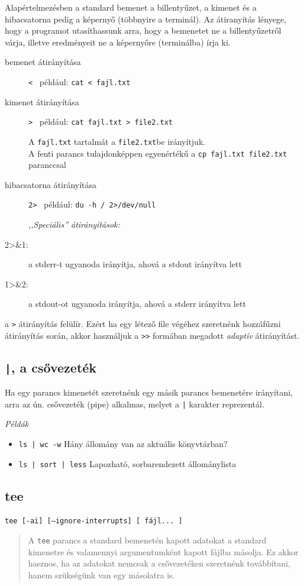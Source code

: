  Alapértelmezésben a standard bemenet a billentyűzet, a kimenet és a hibacsatorna pedig a képernyő (többnyire a terminál). Az átiranyítás lényege, hogy a programot utasíthassunk arra, hogy a bemenetet ne a billentyűzetről várja, illetve eredményeit ne a képernyőre (terminálba) írja ki. 
 
 \begin{description}
 \item[bemenet átirányítása] \verb.<. \ például: \texttt{cat < fajl.txt}
 \item[kimenet átirányítása] \verb.>. \ például: \texttt{cat fajl.txt > file2.txt} 
 
 	A \texttt{fajl.txt} tartalmát a \texttt{file2.txt}be irányítjuk.\\
 	A fenti parancs tulajdonképpen egyenértékű a \texttt{cp fajl.txt file2.txt} paranccsal
 \item[hibacsatorna átirányítása] \verb.2>. \ például: \texttt{du -h / 2>/dev/null}
 \medskip
 
 \textit{,,Speciális'' átirányítások: }
 \item[2>\&1:] a stderr-t ugyanoda irányítja, ahová a stdout irányítva lett
\item[1>\&2:] a stdout-ot ugyanoda irányítja, ahová a stderr irányítva lett

 \end{description}
	
 a \verb.>. átirányítás felülír. Ezért ha egy létező file végéhez szeretnénk hozzáfűzni átirányítás során, akkor használjuk a \verb.>>. formában megadott \textit{adaptív} átirányítást. 


\subsection{\texttt{|}, a csővezeték}
Ha egy parancs kimenetét szeretnénk  egy másik parancs bemenetére irányítani, arra az  ún. csővezeték (pipe) alkalmas, melyet a  \verb.|. karakter reprezentál. \bigskip

\emph{Példák}

\begin{itemize}
\item \verb.ls | wc -w. \hfill Hány állomány van az aktuális könyvtárban? 
\item \verb.ls | sort | less. \hfill Lapozható, sorbarendezett állománylista
\end{itemize}


\subsection{tee}
\hfill\texttt{tee [-ai]  [--ignore-interrupts] [ fájl... ]}
\begin{quotation}
A \verb.tee. parancs a standard bemenetén kapott adatokat a standard kimenetre és valamennyi argumentumként kapott fájlba másolja. Ez akkor hasznos, ha az adatokat nemcsak a csővezetéken szeretnénk továbbítani, hanem szükségünk van egy másolatra is.
\end{quotation}
\bigskip


